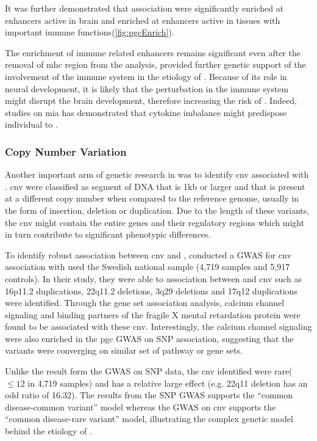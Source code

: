 \documentclass[12pt]{book}
\newcommand*{\glng}{\glsentrylong}
\begin{document}
	It was further demonstrated that \glng{scz} association were significantly enriched at enhancers active in brain and enriched at enhancers active in tissues with important immune functions(\cref{fig:pgcEnrich})\citep{Ripke2014}.
		
	The enrichment of immune related enhancers remains significant even after the removal of \gls{mhc} region from the analysis, provided further genetic support of the involvement of the immune system in the etiology of \glng{scz}.
	Because of its role in neural development\citep{Zhao1998,Deverman2009}, it is likely that the perturbation in the immune system might disrupt the brain development, therefore increasing the risk of \glng{scz}.
	Indeed, studies on \gls{mia} has demonstrated that cytokine imbalance might predispose individual to \glng{scz}\citep{Meyer2009}. 
	
	\subsubsection{Copy Number Variation}
	Another important arm of genetic research in \glng{scz} was to identify \gls{cnv} associated with \glng{scz}.
	\gls{cnv} were classified as segment of DNA that is 1kb or larger and that is present at a different copy number when compared to the reference genome, usually in the form of insertion, deletion or duplication\citep{Feuk2006}.
	Due to the length of these variants, the \gls{cnv} might contain the entire genes and their regulatory regions which might in turn contribute to significant phenotypic differences\citep{Feuk2006}.
	
	To identify robust association between \gls{cnv} and \glng{scz}, \cite{Szatkiewicz2014} conducted a \gls{GWAS} for \gls{cnv} association with \glng{scz} used the Swedish national sample (4,719 \glng{scz} samples and 5,917 controls).
	In their study, they were able to association between \glng{scz} and \gls{cnv} such as 16p11.2 duplications, 22q11.2 deletions, 3q29 deletions and 17q12 duplications were identified.
	Through the gene set association analysis, calcium channel signaling and binding partners of the fragile X mental retardation protein were found to be associated with these \gls{cnv}\citep{Szatkiewicz2014}.
	Interestingly, the calcium channel signaling were also enriched in the \gls{pgc} \gls{GWAS} on \gls{SNP} association, suggesting that the variants were converging on similar set of pathway or gene sets. 
	
	Unlike the result form the \gls{GWAS} on \gls{SNP} data, the \gls{cnv} identified were rare($\le12$ in 4,719 samples) and has a relative large effect (e.g. 22q11 deletion has an odd ratio of 16.32\citep{Szatkiewicz2014}). 
	The results from the \gls{SNP} \gls{GWAS} supports the ``common disease-common variant'' model whereas the \gls{GWAS} on \gls{cnv} supports the ``common disease-rare variant'' model, illustrating the complex genetic model behind the etiology of \glng{scz}.
	
\end{document}
